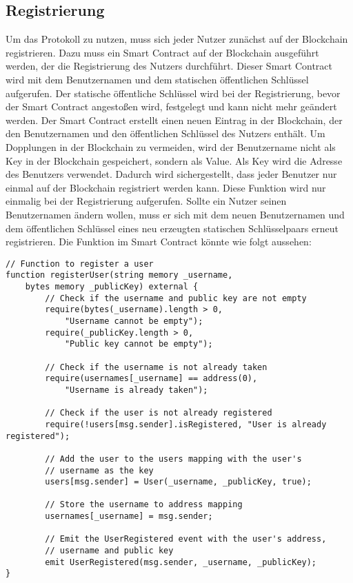 \subsection{Registrierung}
\label{subsec:contract_registrierung}
Um das Protokoll zu nutzen, muss sich jeder Nutzer zunächst auf der Blockchain registrieren. Dazu muss ein Smart Contract auf der Blockchain ausgeführt werden, der die Registrierung des Nutzers durchführt. Dieser Smart Contract wird mit dem Benutzernamen und dem statischen öffentlichen Schlüssel aufgerufen. Der statische öffentliche Schlüssel wird bei der Registrierung, bevor der Smart Contract angestoßen wird, festgelegt und kann nicht mehr geändert werden. Der Smart Contract erstellt einen neuen Eintrag in der Blockchain, der den Benutzernamen und den öffentlichen Schlüssel des Nutzers enthält. Um Dopplungen in der Blockchain zu vermeiden, wird der Benutzername nicht als Key in der Blockchain gespeichert, sondern als Value. Als Key wird die Adresse des Benutzers verwendet. Dadurch wird sichergestellt, dass jeder Benutzer nur einmal auf der Blockchain registriert werden kann. Diese Funktion wird nur einmalig bei der Registrierung aufgerufen. Sollte ein Nutzer seinen Benutzernamen ändern wollen, muss er sich mit dem neuen Benutzernamen und dem öffentlichen Schlüssel eines neu erzeugten statischen Schlüsselpaars erneut registrieren. Die Funktion im Smart Contract könnte wie folgt aussehen:

\begin{lstlisting}[language=Solidity, caption={Registrierung eines Nutzers auf der Blockchain},captionpos=b]
// Function to register a user
function registerUser(string memory _username, 
    bytes memory _publicKey) external {
        // Check if the username and public key are not empty
        require(bytes(_username).length > 0, 
            "Username cannot be empty");
        require(_publicKey.length > 0, 
            "Public key cannot be empty");

        // Check if the username is not already taken
        require(usernames[_username] == address(0), 
            "Username is already taken");

        // Check if the user is not already registered
        require(!users[msg.sender].isRegistered, "User is already registered");

        // Add the user to the users mapping with the user's 
        // username as the key
        users[msg.sender] = User(_username, _publicKey, true);

        // Store the username to address mapping
        usernames[_username] = msg.sender;

        // Emit the UserRegistered event with the user's address, 
        // username and public key
        emit UserRegistered(msg.sender, _username, _publicKey);
}
\end{lstlisting}

